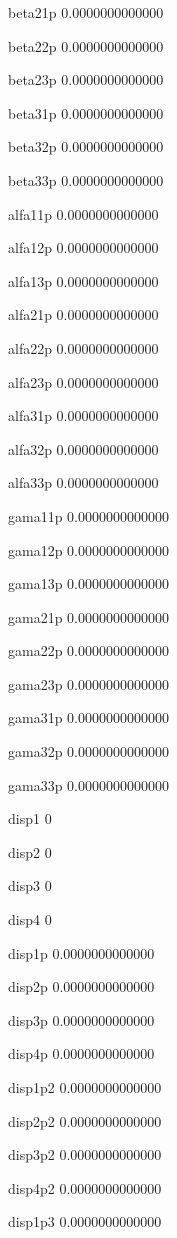  beta21p
   0.0000000000000 
  
 beta22p
   0.0000000000000 
  
 beta23p
   0.0000000000000 
  
 beta31p
   0.0000000000000 
  
 beta32p
   0.0000000000000 
  
 beta33p
   0.0000000000000 
  
 alfa11p
   0.0000000000000 
  
 alfa12p
   0.0000000000000 
  
 alfa13p
   0.0000000000000 
  
 alfa21p
   0.0000000000000 
  
 alfa22p
   0.0000000000000 
  
 alfa23p
   0.0000000000000 
  
 alfa31p
   0.0000000000000 
  
 alfa32p
   0.0000000000000 
  
 alfa33p
   0.0000000000000 
  
 gama11p
   0.0000000000000 
  
 gama12p
   0.0000000000000 
  
 gama13p
   0.0000000000000 
  
 gama21p
   0.0000000000000 
  
 gama22p
   0.0000000000000 
  
 gama23p
   0.0000000000000 
  
 gama31p
   0.0000000000000 
  
 gama32p
   0.0000000000000 
  
 gama33p
   0.0000000000000 
  
 disp1  
 0 
  
 disp2  
 0 
  
 disp3  
 0 
  
 disp4  
 0 
  
 disp1p 
   0.0000000000000 
  
 disp2p 
   0.0000000000000 
  
 disp3p 
   0.0000000000000 
  
 disp4p 
   0.0000000000000 
  
 disp1p2
   0.0000000000000 
  
 disp2p2
   0.0000000000000 
  
 disp3p2
   0.0000000000000 
  
 disp4p2
   0.0000000000000 
  
 disp1p3
   0.0000000000000 
  
